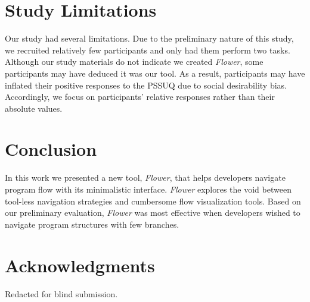\documentclass[conference]{IEEEtran}
\begin{document}
	




\section{Study Limitations}
Our study had several limitations.
Due to the preliminary nature of this study, we recruited relatively few participants and only had them perform two tasks.
Although our study materials do not indicate we created \textit{Flower}, some participants may have deduced it was our tool.
As a result, participants may have inflated their positive responses to the PSSUQ due to social desirability bias.
Accordingly, we focus on participants' relative responses rather than their absolute values.

\section{Conclusion}

In this work we presented a new tool, \textit{Flower}, that helps developers navigate program flow with its minimalistic interface. 
\textit{Flower} explores the void between tool-less navigation strategies and cumbersome flow visualization tools.
Based on our preliminary evaluation, \textit{Flower}  was most effective when developers wished to navigate program structures with few branches.

\section*{Acknowledgments}
Redacted for blind submission.
\end{document}
